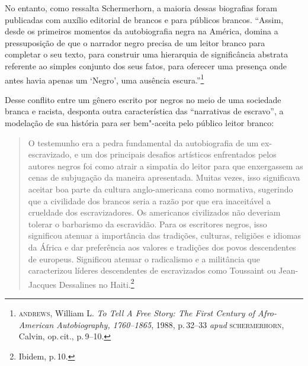 No entanto, como ressalta Schermerhorn, a maioria dessas biografias foram publicadas com auxílio editorial de brancos e para públicos brancos.  “Assim, desde os primeiros momentos da autobiografia negra na América, domina a pressuposição de que o narrador negro precisa de um leitor branco para completar o seu texto, para construir uma
hierarquia de significância abstrata referente ao simples
conjunto dos seus fatos, para oferecer uma presença onde
antes havia apenas um `Negro', uma ausência escura.”\footnote{\textsc{andrews}, William L. \textit{To Tell A Free Story: The First Century of Afro-American Autobiography, 1760–1865}, 1988, p.\,32--33 \textit{apud} \textsc{schermerhorn}, Calvin, op.\,cit., p.\,9--10.}

Desse conflito entre um gênero escrito por negros no meio de uma sociedade branca e racista, desponta outra característica das ``narrativas de escravo'', a modelação de sua história para ser bem"-aceita pelo público leitor branco:

\begin{quote}
O testemunho era a pedra fundamental da autobiografia de um ex-escravizado, e um dos principais desafios artísticos enfrentados pelos autores negros foi como atrair a
simpatia do leitor para que enxergassem as cenas de subjugação da maneira apresentada. Muitas vezes, isso significava aceitar boa parte da cultura anglo-americana como
normativa, sugerindo que a civilidade dos brancos seria a
razão por que era inaceitável a crueldade dos escravizadores. Os americanos civilizados não deveriam tolerar o barbarismo da escravidão. Para os escritores negros, isso
significou atenuar a importância das tradições, culturas, religiões e idiomas da África e dar preferência aos valores e tradições dos povos descendentes de europeus. Significou atenuar o radicalismo e a militância que caracterizou líderes descendentes de escravizados como Toussaint ou Jean-Jacques Dessalines no Haiti.\footnote{Ibidem, p.\,10.}
\end{quote}